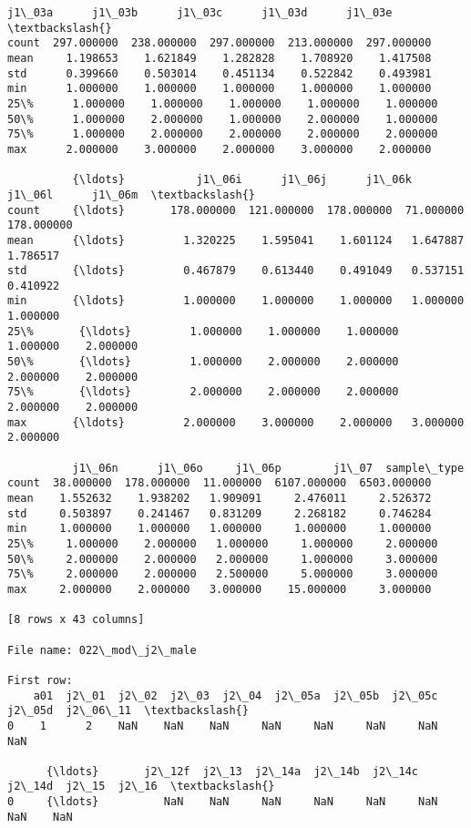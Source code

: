 \documentclass[11pt]{article}
\begin{document}
\begin{Verbatim}[commandchars=\\\{\}]
           j1\_03a      j1\_03b      j1\_03c      j1\_03d      j1\_03e  \textbackslash{}
count  297.000000  238.000000  297.000000  213.000000  297.000000   
mean     1.198653    1.621849    1.282828    1.708920    1.417508   
std      0.399660    0.503014    0.451134    0.522842    0.493981   
min      1.000000    1.000000    1.000000    1.000000    1.000000   
25\%      1.000000    1.000000    1.000000    1.000000    1.000000   
50\%      1.000000    2.000000    1.000000    2.000000    1.000000   
75\%      1.000000    2.000000    2.000000    2.000000    2.000000   
max      2.000000    3.000000    2.000000    3.000000    2.000000   

          {\ldots}           j1\_06i      j1\_06j      j1\_06k     j1\_06l      j1\_06m  \textbackslash{}
count     {\ldots}       178.000000  121.000000  178.000000  71.000000  178.000000   
mean      {\ldots}         1.320225    1.595041    1.601124   1.647887    1.786517   
std       {\ldots}         0.467879    0.613440    0.491049   0.537151    0.410922   
min       {\ldots}         1.000000    1.000000    1.000000   1.000000    1.000000   
25\%       {\ldots}         1.000000    1.000000    1.000000   1.000000    2.000000   
50\%       {\ldots}         1.000000    2.000000    2.000000   2.000000    2.000000   
75\%       {\ldots}         2.000000    2.000000    2.000000   2.000000    2.000000   
max       {\ldots}         2.000000    3.000000    2.000000   3.000000    2.000000   

          j1\_06n      j1\_06o     j1\_06p        j1\_07  sample\_type  
count  38.000000  178.000000  11.000000  6107.000000  6503.000000  
mean    1.552632    1.938202   1.909091     2.476011     2.526372  
std     0.503897    0.241467   0.831209     2.268182     0.746284  
min     1.000000    1.000000   1.000000     1.000000     1.000000  
25\%     1.000000    2.000000   1.000000     1.000000     2.000000  
50\%     2.000000    2.000000   2.000000     1.000000     3.000000  
75\%     2.000000    2.000000   2.500000     5.000000     3.000000  
max     2.000000    2.000000   3.000000    15.000000     3.000000  

[8 rows x 43 columns]

File name: 022\_mod\_j2\_male

First row: 
    a01  j2\_01  j2\_02  j2\_03  j2\_04  j2\_05a  j2\_05b  j2\_05c  j2\_05d  j2\_06\_11  \textbackslash{}
0    1      2    NaN    NaN    NaN     NaN     NaN     NaN     NaN       NaN   

      {\ldots}       j2\_12f  j2\_13  j2\_14a  j2\_14b  j2\_14c  j2\_14d  j2\_15  j2\_16  \textbackslash{}
0     {\ldots}          NaN    NaN     NaN     NaN     NaN     NaN    NaN    NaN   


\end{Verbatim}
\end{document}
